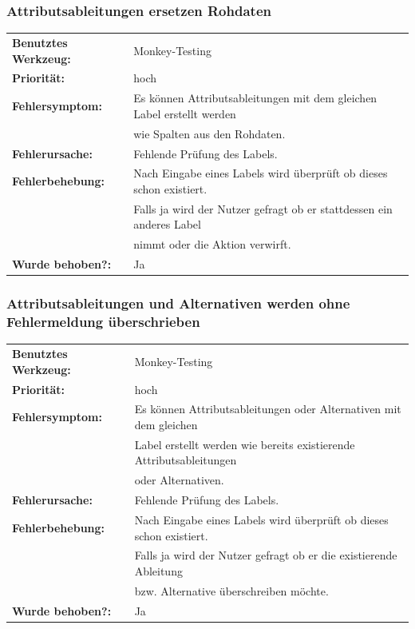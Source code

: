 \documentclass{article}
\begin{document}
\subsubsection*{Attributsableitungen ersetzen Rohdaten}
\begin{tabular}{ll}
    \textbf{Benutztes Werkzeug:} & Monkey-Testing\\
    \textbf{Priorität:} & hoch\\
    \textbf{Fehlersymptom:} & Es können Attributsableitungen mit dem gleichen Label erstellt werden\\
    & wie Spalten aus den Rohdaten.\\
    \textbf{Fehlerursache:} & Fehlende Prüfung des Labels.\\
    \textbf{Fehlerbehebung:} & Nach Eingabe eines Labels wird überprüft ob dieses schon existiert.\\
    & Falls ja wird der Nutzer gefragt ob er stattdessen ein anderes Label\\
    & nimmt oder die Aktion verwirft.\\
    \textbf{Wurde behoben?:} & Ja\\
\end{tabular}

\subsubsection*{Attributsableitungen und Alternativen werden ohne Fehlermeldung überschrieben}
\begin{tabular}{ll}
    \textbf{Benutztes Werkzeug:} & Monkey-Testing\\
    \textbf{Priorität:} & hoch\\
    \textbf{Fehlersymptom:} & Es können Attributsableitungen oder Alternativen mit dem gleichen\\
    & Label erstellt werden wie bereits existierende Attributsableitungen\\
    & oder Alternativen.\\
    \textbf{Fehlerursache:} & Fehlende Prüfung des Labels.\\
    \textbf{Fehlerbehebung:} & Nach Eingabe eines Labels wird überprüft ob dieses schon existiert.\\
    & Falls ja wird der Nutzer gefragt ob er die existierende Ableitung\\
    & bzw. Alternative überschreiben möchte.\\
    \textbf{Wurde behoben?:} & Ja\\
\end{tabular}
\end{document}
